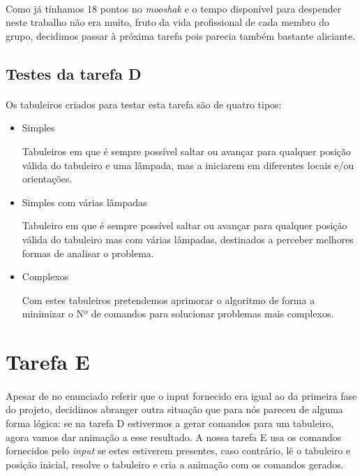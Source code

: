 \documentclass[a4paper,12pt]{article}
\begin{document}
\paragraph{}
Como já tínhamos 18 pontos no \emph{mooshak} e o tempo disponível para despender neste trabalho não era muito, fruto da vida profissional de cada membro do grupo, decidimos passar à próxima tarefa pois parecia também bastante aliciante.


\subsection{Testes da tarefa D}

\paragraph{}
Os tabuleiros criados para testar esta tarefa são de quatro tipos:
\begin{itemize}
\item Simples

Tabuleiros em que é sempre possível saltar ou avançar para qualquer posição válida do tabuleiro e uma lâmpada, mas a iniciarem em diferentes locais e/ou orientações.
\item Simples com várias lâmpadas

Tabuleiro em que é sempre possível saltar ou avançar para qualquer posição válida do tabuleiro mas com várias lâmpadas, destinados a perceber melhores formas de analisar o problema.
\item Complexos

Com estes tabuleiros pretendemos aprimorar o algoritmo de forma a minimizar o Nº de comandos para solucionar problemas mais complexos.


\end{itemize}
\section{Tarefa E}

\paragraph{}
Apesar de no enunciado referir que o input fornecido era igual ao da primeira fase do projeto, decidimos abranger outra situação que para nós pareceu de alguma forma lógica: se na tarefa D estivermos a gerar comandos para um tabuleiro, agora vamos dar animação a esse resultado. A nossa tarefa E usa os comandos fornecidos pelo \emph{input} se estes estiverem presentes, caso contrário, lê o tabuleiro e posição inicial, resolve o tabuleiro e cria a animação com os comandos gerados.
\end{document}
